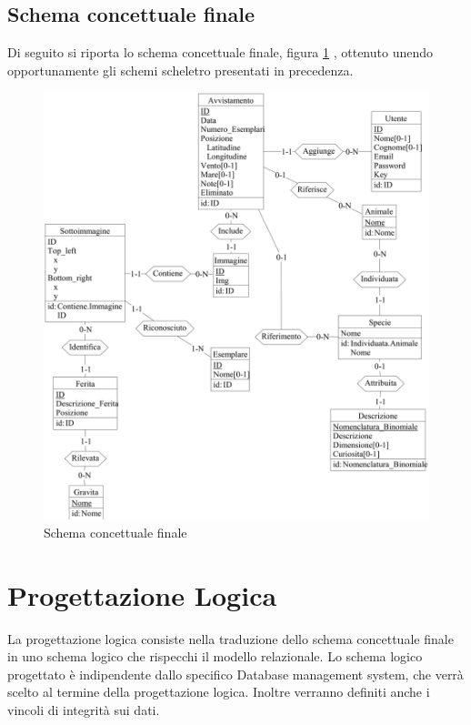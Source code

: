 \documentclass[a4paper,final,12pt]{report}
\begin{document}
\subsection{Schema concettuale finale}
Di seguito si riporta lo schema concettuale finale, figura \ref{figura:schemafinaledicoassd} , ottenuto unendo opportunamente gli schemi scheletro presentati in precedenza.
\newpage

\begin{figure}[hbtp]
\centering
\includegraphics[scale=0.1]{img_concettuale/ER2.png}
\caption{Schema concettuale finale}
\label{figura:schemafinaledicoassd}
\end{figure}

\section{Progettazione Logica}
La progettazione logica consiste nella traduzione dello schema concettuale finale in uno schema logico che rispecchi il modello relazionale. Lo schema logico progettato è indipendente dallo specifico Database management system, che verrà scelto al termine della progettazione logica. Inoltre verranno definiti anche i vincoli di integrità sui dati.
\end{document}
